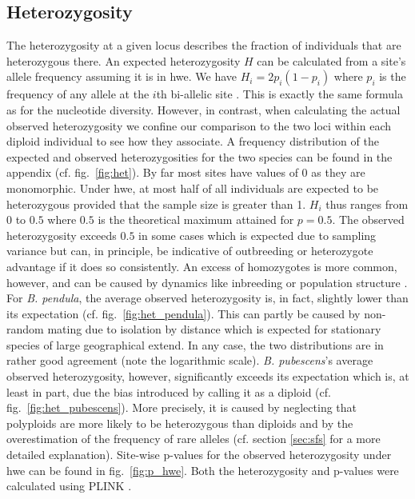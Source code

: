 \documentclass[hidelinks,11pt]{article}
\newcommand{\pendula}{\textit{B. pendula}}
\newcommand{\pubescens}{\textit{B. pubescens}}
\begin{document}
{    \subsection{Heterozygosity}
    \label{sec:het}

    The heterozygosity at a given locus describes the fraction of individuals that are heterozygous there. An expected heterozygosity $H$ can be calculated from a site's allele frequency assuming it is in \acrfull{hwe}. We have $H_i = 2p_i(1-p_i)$ where $p_i$ is the frequency of any allele at the $i$th bi-allelic site \cite{gillespie}. This is exactly the same formula as for the nucleotide diversity. However, in contrast, when calculating the actual observed heterozygosity we confine our comparison to the two loci within each diploid individual to see how they associate. A frequency distribution of the expected and observed heterozygosities for the two species can be found in the appendix (cf. fig.~\ref{fig:het}). By far most sites have values of $0$ as they are monomorphic. Under \acrshort{hwe}, at most half of all individuals are expected to be heterozygous provided that the sample size is greater than 1. $H_i$ thus ranges from $0$ to $0.5$ where $0.5$ is the theoretical maximum attained for $p = 0.5$. The observed heterozygosity exceeds $0.5$ in some cases which is expected due to sampling variance but can, in principle, be indicative of outbreeding or heterozygote advantage if it does so consistently. An excess of homozygotes is more common, however, and can be caused by dynamics like inbreeding or population structure \cite{gillespie}. For \pendula{}, the average observed heterozygosity is, in fact, slightly lower than its expectation (cf. fig.~\ref{fig:het_pendula}). This can partly be caused by non-random mating due to isolation by distance which is expected for stationary species of large geographical extend. In any case, the two distributions are in rather good agreement (note the logarithmic scale). \pubescens{}'s average observed heterozygosity, however, significantly exceeds its expectation which is, at least in part, due the bias introduced by calling it as a diploid (cf. fig.~\ref{fig:het_pubescens}). More precisely, it is caused by neglecting that polyploids are more likely to be heterozygous than diploids and by the overestimation of the frequency of rare alleles (cf. section \ref{sec:sfs} for a more detailed explanation). Site-wise p-values for the observed heterozygosity under \acrlong{hwe} can be found in fig.~\ref{fig:p_hwe}. Both the heterozygosity and p-values were calculated using PLINK \cite{plink, hwe-plink}.

}
\end{document}
